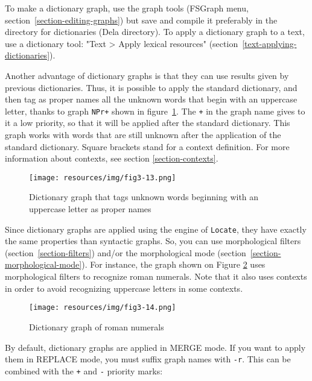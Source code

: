\bigskip
\noindent To make a dictionary graph, use the graph tools (FSGraph menu, section~\ref{section-editing-graphs})
but save and compile it preferably in the directory for dictionaries (Dela directory).
To apply a dictionary graph to a text, use a dictionary tool: "Text > Apply lexical resources" (section~\ref{text-applying-dictionaries}).

\bigskip
\noindent Another advantage of dictionary graphs is that they can use results
given by previous dictionaries. Thus, it is possible to apply the standard dictionary, and then tag as proper
names all the unknown words that begin with an uppercase letter, thanks to
graph \verb$NPr+$ shown in figure~\ref{graph-NPr}. The \verb$+$ in the graph
name gives to it a low priority, so that it will be applied after the standard
dictionary. This graph works with words that are still unknown after the
application of the standard dictionary. Square brackets stand for a context definition.
For more information about contexts, see section
\ref{section-contexts}.

\begin{figure}[!ht]
\begin{center}
\texttt{[image: resources/img/fig3-13.png]}
\caption{Dictionary graph that tags unknown words beginning with an uppercase letter as proper names\label{graph-NPr}}
\end{center}
\end{figure}

\noindent Since dictionary graphs are applied using the engine of \verb+Locate+,
they have exactly the same properties than syntactic graphs. So,
you can use morphological filters (section~\ref{section-filters})
and/or the morphological mode (section~\ref{section-morphological-mode}).
For instance, the
graph shown on Figure \ref{graph-CR} uses morphological filters to recognize
roman numerals. Note that it also uses contexts in order to avoid recognizing 
uppercase letters in some contexts.

\begin{figure}[!p]
\begin{center}
\texttt{[image: resources/img/fig3-14.png]}
\caption{Dictionary graph of roman numerals\label{graph-CR}}
\end{center}
\end{figure}

\bigskip
\noindent By default, dictionary graphs are applied in MERGE mode. If you want
to apply them in REPLACE mode, you must suffix graph names with \verb+-r+. This can
be combined with the \verb-+- and \verb+-+ priority marks:

